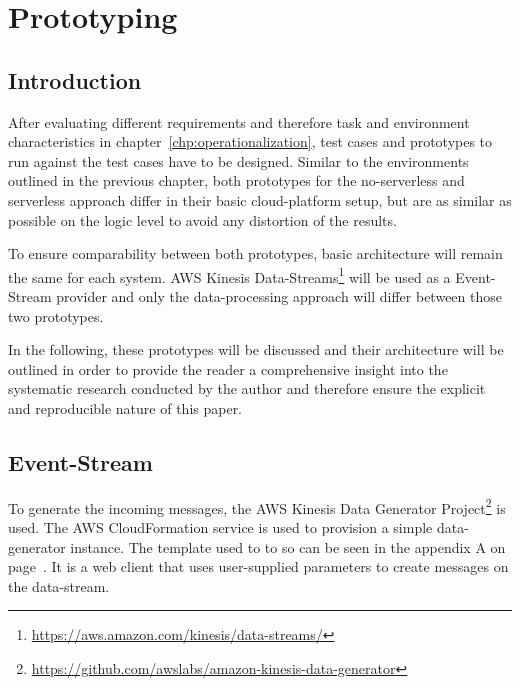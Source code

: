 \chapter{Prototyping}\label{chp:prototyping}


\section{Introduction}

After evaluating different requirements and therefore task and environment characteristics in chapter~\vref{chp:operationalization}, test cases and prototypes to run against the test cases have to be designed. Similar to the environments outlined in the previous chapter, both prototypes for the no-serverless and serverless approach differ in their basic cloud-platform setup, but are as similar as possible on the logic level to avoid any distortion of the results.

To ensure comparability between both prototypes, basic architecture will remain the same for each system. AWS Kinesis Data-Streams\footnote{\url{https://aws.amazon.com/kinesis/data-streams/}} will be used as a Event-Stream provider and only the data-processing approach will differ between those two prototypes. 

In the following, these prototypes will be discussed and their architecture will be outlined in order to provide the reader a comprehensive insight into the systematic research conducted by the author and therefore ensure the explicit and reproducible nature of this paper. 



\section{Event-Stream}\label{chp:protoEvent-Stream}

To generate the incoming messages, the AWS Kinesis Data Generator Project\footnote{\url{https://github.com/awslabs/amazon-kinesis-data-generator}} is used. The AWS CloudFormation service is used to provision a simple data-generator instance. The template used to to so can be seen in the appendix A on page~\pageref{app:KDG}. It is a web client that uses user-supplied parameters to create messages on the data-stream. 

